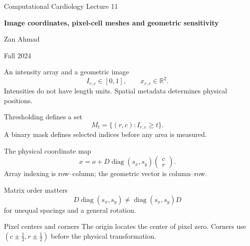 \documentclass[aspectratio=169,11pt]{beamer}
\newcommand{\notestarget}{notes.pdf}\newcommand{\noteslabel}{Notes}
\begin{document}
\begin{frame}[plain]\vfill
{\small\color{accent} Computational Cardiology \quad Lecture 11}\par\medskip
{\raggedright{}\LARGE\bfseries\color{ink} Image coordinates, pixel-cell meshes and geometric sensitivity}\par\bigskip
Zan Ahmad\par\smallskip
{\small Fall 2024}\par\vfill\end{frame}
\renewcommand{\notestarget}{notes.pdf\#note-intensity-arrays-and-spatial-metadata}
\begin{frame}[t,fragile,label=slide-an-intensity-array-and-a-geometric-image]{An intensity array and a geometric image}
\[I_{r,c}\in[0,1],\qquad x_{r,c}\in\mathbb R^2.\]\pause{} Intensities do not have length units. Spatial metadata determines physical positions.
\end{frame}
\renewcommand{\notestarget}{notes.pdf\#note-intensity-arrays-and-spatial-metadata}
\begin{frame}[t,fragile,label=slide-thresholding-defines-a-set]{Thresholding defines a set}
\[M_t=\{(r,c):I_{r,c}\ge t\}.\]\pause{} A binary mask defines selected indices before any area is measured.
\end{frame}
\renewcommand{\notestarget}{notes.pdf\#note-the-affine-index-to-physical-map}
\begin{frame}[t,fragile,label=slide-the-physical-coordinate-map]{The physical coordinate map}
\[x=o+D\operatorname{diag}(s_x,s_y)\begin{pmatrix}c\\r\end{pmatrix}.\]\pause{} Array indexing is row--column; the geometric vector is column--row.
\end{frame}
\renewcommand{\notestarget}{notes.pdf\#note-the-affine-index-to-physical-map}
\begin{frame}[t,fragile,label=slide-matrix-order-matters]{Matrix order matters}
\[D\operatorname{diag}(s_x,s_y)\ne\operatorname{diag}(s_x,s_y)D\]\pause{} for unequal spacings and a general rotation.
\end{frame}
\renewcommand{\notestarget}{notes.pdf\#note-the-affine-index-to-physical-map}
\begin{frame}[t,fragile,label=slide-pixel-centers-and-corners]{Pixel centers and corners}
The origin locates the center of pixel zero.\pause{} Corners use $(c\pm\tfrac12,r\pm\tfrac12)$ before the physical transformation.
\end{frame}
\end{document}
